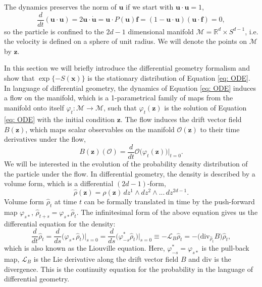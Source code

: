 \documentclass[tablecaption=bottom,wcp]{jmlr} %
\newcommand{\x}{\boldsymbol{x}}
\newcommand{\U}{\boldsymbol{u}}
\newcommand{\Z}{\boldsymbol{z}}
\begin{document}
The dynamics preserves the norm of $\U$ if we start with $\U \cdot \U = 1$,
\begin{equation} 
    \frac{d}{dt}(\U \cdot \U) = 2 \U \cdot \dot{\U} = \U \cdot P(\U) \boldsymbol{f}= (1 - \U \cdot \U) (\U \cdot \boldsymbol{f}) = 0,
\end{equation}
so the particle is confined to the $2d -1$ dimensional manifold $\mathcal{M} = \mathbb{R}^d \times S^{d -1}$, i.e. the velocity 
is defined on a sphere of unit radius. We will denote the points on $\mathcal{M}$ by $\Z$. 

In this section we will briefly introduce the differential geometry formalism and show that $\exp\{-S(\x)\}$ is the stationary distribution of Equation \eqref{eq: ODE}.
In language of differential geometry, the dynamics of Equation \eqref{eq: ODE} induces a flow on the manifold, which is a 1-parametrical family of maps from the manifold onto itself $\varphi_t : \mathcal{M} \xrightarrow[]{} \mathcal{M}$, such that $\varphi_t(\Z)$ is the solution of Equation \eqref{eq: ODE} with the initial condition $\Z$. The flow induces the drift vector field $B(\boldsymbol{z})$, which maps scalar observables on the manifold $\mathcal{O}(\Z)$ to their time derivatives under the flow,
\begin{equation} 
    B(\Z)(\mathcal{O}) = \frac{d}{d t} \mathcal{O} \big( \varphi_t (\Z) \big) \vert_{t = 0}.
\end{equation}
We will be interested in the evolution of the probability density distribution of the particle under the flow. In differential geometry, the density is described by a volume form, which is a differential $(2d-1)$-form,
\begin{equation}
    \widehat{\rho}(\Z) = \rho(\Z) \, d z^1 \wedge d z^2 \wedge...\, dz^{2d -1}.
\end{equation}
Volume form $\widehat{\rho}_t$ at time $t$ can be formally translated in time by the push-forward map $\varphi_{s *}$, $\widehat{\rho}_{t+s} = \varphi_{s *} \widehat{\rho}_t$. The infinitesimal form of the above equation gives us the differential equation for the density:
\begin{equation} \label{eq: Liouville}
    \frac{d}{dt} \widehat{\rho}_t = \frac{d}{ds} \big( \varphi_{s *} \widehat{\rho}_t \big) \vert_{s = 0} = \frac{d}{ds} \big( \varphi_{-s}^* \widehat{\rho}_t \big) \vert_{s = 0} \equiv - \mathcal{L}_{B} \widehat{\rho}_t  = - \big( \mathrm{div}_{\widehat{\rho}_t} B \big) \widehat{\rho}_t,
\end{equation}
which is also known as the Liouville equation. Here, $\varphi^*_{-s} = \varphi_{s *}$ is the pull-back map, $\mathcal{L}_{B}$ is the Lie derivative along the drift vector field $B$ and $\mathrm{div}$ is the divergence. This is the continuity equation for the probability in the language of differential geometry. 
\end{document}
